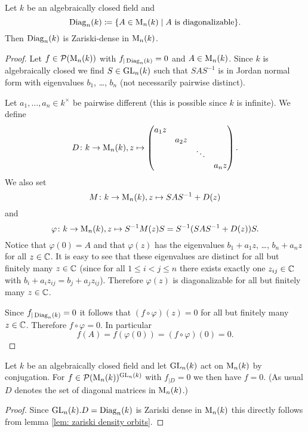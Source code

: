\begin{prop}
 Let $k$ be an algebraically closed field and
 \[
  \operatorname{Diag}_n(k) \coloneqq \{A \in \operatorname{M}_n(k) \mid \text{$A$ is diagonalizable}\}.
 \]
 Then $\operatorname{Diag}_n(k)$ is Zariski-dense in $\operatorname{M}_n(k)$.
\end{prop}
\begin{proof}
 Let $f \in \mathcal{P}(\operatorname{M}_n(k))$ with $f_{|\operatorname{Diag}_n(k)} = 0$ and $A \in \operatorname{M}_n(k)$. Since $k$ is algebraically closed we find $S \in \operatorname{GL}_n(k)$ such that $SAS^{-1}$ is in Jordan normal form with eigenvalues $b_1$, \dots, $b_n$ (not necessarily pairwise distinct).
 
 Let $a_1, \dotsc, a_n \in k^\times$ be pairwise different (this is possible since $k$ is infinite). We define
 \[
  D \colon k \to \operatorname{M}_n(k), z \mapsto
  \begin{pmatrix}
   a_1 z &       &        &       \\
         & a_2 z &        &       \\
         &       & \ddots &       \\
         &       &        & a_n z
  \end{pmatrix}.
 \]
 We also set
 \[
  M \colon k \to \operatorname{M}_n(k), z \mapsto SAS^{-1} + D(z)
 \]
 and
 \[
  \varphi \colon k \to \operatorname{M}_n(k), z \mapsto S^{-1} M(z) S = S^{-1}(SAS^{-1}+D(z))S.
 \]
 Notice that $\varphi(0) = A$ and that $\varphi(z)$ has the eigenvalues $b_1 + a_1 z$, \dots, $b_n + a_n z$ for all $z \in \mathbb{C}$. It is easy to see that these eigenvalues are distinct for all but finitely many $z \in \mathbb{C}$ (since for all $1 \leq i < j \leq n$ there exists exactly one $z_{ij} \in \mathbb{C}$ with $b_i + a_i z_{ij} = b_j + a_j z_{ij}$). Therefore $\varphi(z)$ is diagonalizable for all but finitely many $z \in \mathbb{C}$.
 
 Since $f_{|\operatorname{Diag}_n(k)} = 0$ it follows that $(f \circ \varphi)(z) = 0$ for all but finitely many $z \in \mathbb{C}$. Therefore $f \circ \varphi = 0$. In particular
 \[
  f(A) = f(\varphi(0)) = (f \circ \varphi)(0) = 0.
 \]
\end{proof}


\begin{cor}\label{cor: diagonal matrices dense alg closed}
 Let $k$ be an algebraically closed field and let $\operatorname{GL}_n(k)$ act on $\operatorname{M}_n(k)$ by conjugation. For $f \in \mathcal{P}(\operatorname{M}_n(k))^{\operatorname{GL}_n(k)}$ with $f_{|D} = 0$ we then have $f = 0$. (As usual $D$ denotes the set of diagonal matrices in $\operatorname{M}_n(k)$.)
\end{cor}
\begin{proof}
 Since $\operatorname{GL}_n(k).D = \operatorname{Diag}_n(k)$ is Zariski dense in $\operatorname{M}_n(k)$ this directly follows from lemma \ref{lem: zariski density orbits}.
\end{proof}


